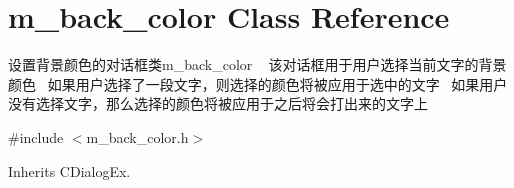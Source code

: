 \hypertarget{classm__back__color}{}\section{m\+\_\+back\+\_\+color Class Reference}
\label{classm__back__color}


设置背景颜色的对话框类m\+\_\+back\+\_\+color ~\newline
该对话框用于用户选择当前文字的背景颜色~\newline
如果用户选择了一段文字，则选择的颜色将被应用于选中的文字~\newline
如果用户没有选择文字，那么选择的颜色将被应用于之后将会打出来的文字上~\newline
 




{\ttfamily \#include $<$m\+\_\+back\+\_\+color.\+h$>$}



Inherits C\+Dialog\+Ex.

